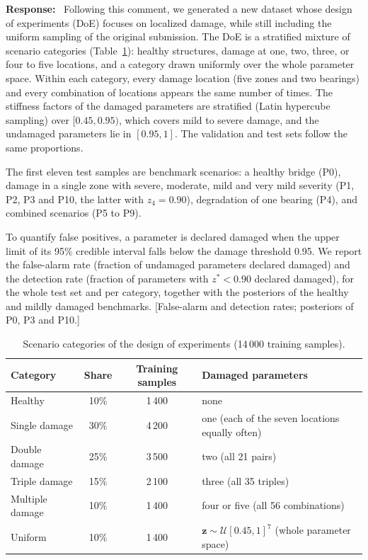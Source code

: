 \documentclass[11pt]{article}
\newenvironment{response}{\par\smallskip\noindent\color{resp}\textbf{Response:}\ }{\par}
\newcommand{\tbd}[1]{\textcolor{note}{\textsf{[#1]}}}
\newcommand{\z}{\mathbf{z}}
\begin{document}
\begin{response}
Following this comment, we generated a new dataset whose design of experiments (DoE) focuses on localized damage, while
still including the uniform sampling of the original submission. The DoE is a stratified mixture of scenario categories
(Table~\ref{tab:doe}): healthy structures, damage at one, two, three, or four to five locations, and a category drawn
uniformly over the whole parameter space. Within each category, every damage location (five zones and two bearings) and
every combination of locations appears the same number of times. The stiffness factors of the damaged parameters are
stratified (Latin hypercube sampling) over $[0.45,0.95)$, which covers mild to severe damage, and the undamaged
parameters lie in $[0.95,1]$. The validation and test sets follow the same proportions.

The first eleven test samples are benchmark scenarios: a healthy bridge (P0), damage in a single zone with severe,
moderate, mild and very mild severity (P1, P2, P3 and P10, the latter with $z_4=0.90$), degradation of one bearing (P4),
and combined scenarios (P5 to P9).

To quantify false positives, a parameter is declared damaged when the upper limit of its 95\% credible interval falls
below the damage threshold 0.95. We report the false-alarm rate (fraction of undamaged parameters declared damaged) and the
detection rate (fraction of parameters with $z^*<0.90$ declared damaged), for the whole test set and per category,
together with the posteriors of the healthy and mildly damaged benchmarks.
\tbd{False-alarm and detection rates; posteriors of P0, P3 and P10.}
\end{response}

\begin{table}[H]
\centering\small
\caption{Scenario categories of the design of experiments (14\,000 training samples).}
\label{tab:doe}
\begin{tabular}{lccl}
\toprule
Category & Share & Training samples & Damaged parameters \\
\midrule
Healthy & 10\% & 1\,400 & none \\
Single damage & 30\% & 4\,200 & one (each of the seven locations equally often) \\
Double damage & 25\% & 3\,500 & two (all 21 pairs) \\
Triple damage & 15\% & 2\,100 & three (all 35 triples) \\
Multiple damage & 10\% & 1\,400 & four or five (all 56 combinations) \\
Uniform & 10\% & 1\,400 & $\z\sim\mathcal{U}[0.45,1]^7$ (whole parameter space) \\
\bottomrule
\end{tabular}
\end{table}
\end{document}
